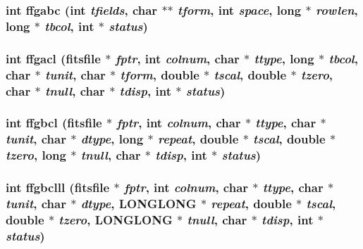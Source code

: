 \subsubsection{\setlength{\rightskip}{0pt plus 5cm}int ffgabc (int {\em tfields}, char $\ast$$\ast$ {\em tform}, int {\em space}, long $\ast$ {\em rowlen}, long $\ast$ {\em tbcol}, int $\ast$ {\em status})}\label{src_2fitsio_8h_c5fba60d67c46af10be7619df523ce11}


\subsubsection{\setlength{\rightskip}{0pt plus 5cm}int ffgacl (\bf{fitsfile} $\ast$ {\em fptr}, int {\em colnum}, char $\ast$ {\em ttype}, long $\ast$ {\em tbcol}, char $\ast$ {\em tunit}, char $\ast$ {\em tform}, double $\ast$ {\em tscal}, double $\ast$ {\em tzero}, char $\ast$ {\em tnull}, char $\ast$ {\em tdisp}, int $\ast$ {\em status})}\label{src_2fitsio_8h_4bb154796602a968ef9110aa4fdb65ba}


\subsubsection{\setlength{\rightskip}{0pt plus 5cm}int ffgbcl (\bf{fitsfile} $\ast$ {\em fptr}, int {\em colnum}, char $\ast$ {\em ttype}, char $\ast$ {\em tunit}, char $\ast$ {\em dtype}, long $\ast$ {\em repeat}, double $\ast$ {\em tscal}, double $\ast$ {\em tzero}, long $\ast$ {\em tnull}, char $\ast$ {\em tdisp}, int $\ast$ {\em status})}\label{src_2fitsio_8h_3ddad62e5a9a9a05e6276badb897bc96}


\subsubsection{\setlength{\rightskip}{0pt plus 5cm}int ffgbclll (\bf{fitsfile} $\ast$ {\em fptr}, int {\em colnum}, char $\ast$ {\em ttype}, char $\ast$ {\em tunit}, char $\ast$ {\em dtype}, \bf{LONGLONG} $\ast$ {\em repeat}, double $\ast$ {\em tscal}, double $\ast$ {\em tzero}, \bf{LONGLONG} $\ast$ {\em tnull}, char $\ast$ {\em tdisp}, int $\ast$ {\em status})}\label{src_2fitsio_8h_a3e635921cb5dce7a25d020a6d1d85c4}


